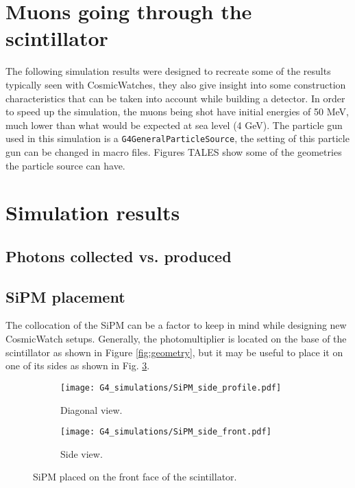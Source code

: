 \section{Muons going through the scintillator}

The following simulation results were designed to recreate some of the results typically seen with CosmicWatches, they also give insight into some construction characteristics that can be taken into account while building a detector. In order to speed up the simulation, the muons being shot have initial energies of 50 \unit{\mega\eV}, much lower than what would be expected at sea level (4 \unit{\giga\eV}). The particle gun used in this simulation is a \texttt{G4GeneralParticleSource}, the setting of this particle gun can be changed in macro files. Figures TALES show some of the geometries the particle source can have.

\section{Simulation results}

\subsection{Photons collected vs. produced}\label{sec:collected_produced}

\subsection{SiPM placement}\label{sec:SiPM_placement}

The collocation of the SiPM can be a factor to keep in mind while designing new CosmicWatch setups. Generally, the photomultiplier is located on the base of the scintillator as shown in Figure \ref{fig:geometry}, but it may be useful to place it on one of its sides as shown in Fig. \ref{fig:SiPM_side}.

\begin{figure}[H]
  \centering
  \begin{subfigure}[t]{0.48\textwidth}
    \texttt{[image: G4\_simulations/SiPM\_side\_profile.pdf]}
    \caption{\label{sfig:SiPM_side_profile}Diagonal view.}
  \end{subfigure}
  \hfill
  \begin{subfigure}[t]{0.48\textwidth}
    \texttt{[image: G4\_simulations/SiPM\_side\_front.pdf]}
    \caption{\label{sfig:SiPM_side_front}Side view.}
  \end{subfigure}
  \caption{\label{fig:SiPM_side}SiPM placed on the front face of the scintillator.}
\end{figure}

